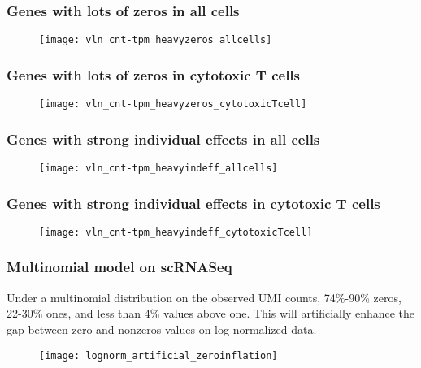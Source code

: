 \begin{frame}
\frametitle{Genes with lots of zeros in all cells}
\begin{figure}
  \centering
  \texttt{[image: vln\_cnt-tpm\_heavyzeros\_allcells]}
\end{figure}
\end{frame}

\begin{frame}
  \frametitle{Genes with lots of zeros in cytotoxic T cells}
  \begin{figure}
    \centering
    \texttt{[image: vln\_cnt-tpm\_heavyzeros\_cytotoxicTcell]}
  \end{figure}
\end{frame}

\begin{frame}
\frametitle{Genes with strong individual effects in all cells}
\begin{figure}
  \centering
  \texttt{[image: vln\_cnt-tpm\_heavyindeff\_allcells]}
\end{figure}
\end{frame}

\begin{frame}
  \frametitle{Genes with strong individual effects in cytotoxic T cells}
  \begin{figure}
    \centering
    \texttt{[image: vln\_cnt-tpm\_heavyindeff\_cytotoxicTcell]}
  \end{figure}
\end{frame}

\begin{frame}
  \frametitle{Multinomial model on scRNASeq \cite{townes2019feature}}
  Under a multinomial distribution on the observed UMI counts, 74\%-90\%
  zeros, 22-30\% ones, and less than 4\% values above one. This will
  artificially enhance the gap between zero and nonzeros values on
  log-normalized data.
  \begin{figure}
    \centering
    \texttt{[image: lognorm\_artificial\_zeroinflation]}
  \end{figure}
\end{frame}

